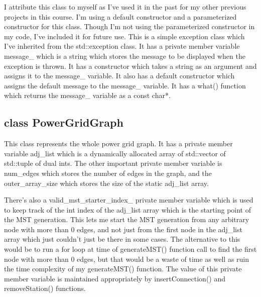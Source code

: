 \documentclass[a4paper]{article}
\begin{document}
		I attribute this class to myself as I've used it in the past for my other previous projects in this course.
		I'm using a default constructor and a parameterized constructor for this class. Though I'm not using the 
		parameterized constructor in my code, I've included it for future use.
		This is a simple exception class which I've inherited from the {\color{draculapurple}std::exception} class. 
		It has a private member variable {\color{Turquoise}message\_} which is a string which stores the message to be 
		displayed when the exception is thrown. It has a constructor which takes a string as an argument and assigns it 
		to the {\color{Turquoise}message\_} variable. It also has a default constructor which assigns the default 
		message to the {\color{Turquoise}message\_} variable. It has a {\color{draculapurple}what()} function which returns 
		the {\color{Turquoise}message\_} variable as a {\color{draculapurple}const char*}.


	\subsection{{\color{orange}class} {\Large{\color{draculapurple}PowerGridGraph}}}

		This class represents the whole power grid graph. It has a private member variable {\color{Turquoise}adj\_list} which is a 
		dynamically allocated array of {\color{draculapurple}std::vector} of {\color{draculapurple}std::tuple} of dual {\color{draculapurple}int}s.
		The other important private member variable is {\color{Turquoise}num\_edges} which stores the number of edges in the graph, 
		and the {\color{Turquoise}outer\_array\_size} which stores the size of the static {\color{Turquoise}adj\_list} array.

		There's also a {\color{Turquoise}valid\_mst\_starter\_index\_} private member variable which is used to keep track of the 
		{\color{draculapurple}int} index of the {\color{Turquoise}adj\_list} array which is the starting point of the MST generation.
		This lets me start the MST generation from any arbitrary node with more than 0 edges, and not just from the first node in the 
		{\color{Turquoise}adj\_list} array which just couldn't just be there in some cases. The alternative to this would be to run a for loop at time of 
		{\color{draculapurple}generateMST}() function call to find the first node with more than 0 edges, but that would be a waste of time as well as ruin the time complexity of my 
		{\color{draculapurple}generateMST}() function. The value of this private member variable is maintained appropriately by {\color{draculapurple}insertConnection}() and 
		{\color{draculapurple}removeStation}() functions.
\end{document}
